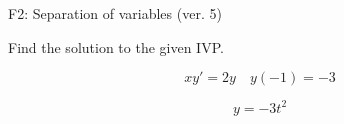 \begin{exercise}
  \begin{exerciseTitle}F2: Separation of variables (ver. 5)\end{exerciseTitle}
  \begin{exerciseStatement}
    
Find the solution to the given IVP.

    
\[xy'= 2 y \hspace{1em} y( -1 ) = -3\]

  \end{exerciseStatement}
  \begin{exerciseAnswer}
    
\[y= -3 t^ 2\]

  \end{exerciseAnswer}
\end{exercise}